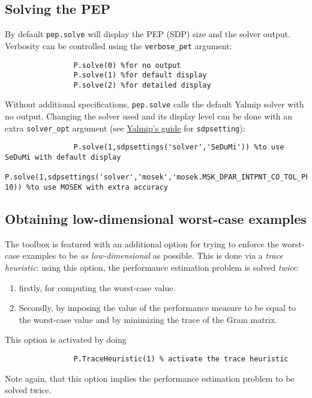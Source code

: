 \documentclass[11pt,a4paper]{article}
\begin{document}
				\subsection{Solving the PEP}
				By default \verb|pep.solve| will display the PEP (SDP) size and the solver output.
				Verbosity can be controlled using the \verb?verbose_pet? argument:
				\begin{lstlisting}
				P.solve(0) %for no output
				P.solve(1) %for default display
				P.solve(2) %for detailed display
				\end{lstlisting}
				Without additional specifications, \verb|pep.solve| calls the default Yalmip solver with no output.
				Changing the solver used and its display level can be done with an extra \verb|solver_opt| argument (see \href{https://yalmip.github.io/command/sdpsettings/}{Yalmip's guide} for \verb|sdpsetting|):
				\begin{lstlisting}
				P.solve(1,sdpsettings('solver','SeDuMi')) %to use SeDuMi with default display
				P.solve(1,sdpsettings('solver','mosek','mosek.MSK_DPAR_INTPNT_CO_TOL_PFEAS',1e-10)) %to use MOSEK with extra accuracy
				\end{lstlisting}
				\subsection{Obtaining low-dimensional worst-case examples}
				The toolbox is featured with an additional option for trying to enforce the worst-case examples to be \emph{as low-dimensional} as possible.
				This is done via a \emph{trace heuristic}: using this option, the performance estimation problem is solved \emph{twice}:
				\begin{enumerate}
					\item firstly, for computing the worst-case value.
					\item Secondly, by imposing the value of the performance measure to be equal to the worst-case value and by minimizing the trace of the Gram matrix.
				\end{enumerate}
				This option is activated by doing
				\begin{lstlisting}
				P.TraceHeuristic(1) % activate the trace heuristic
				\end{lstlisting}
				Note again, that this option implies the performance estimation problem to be solved twice.
\end{document}
